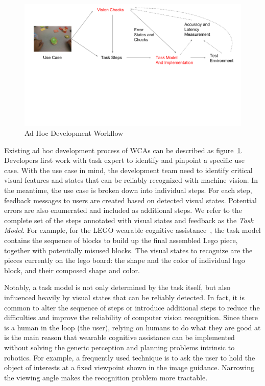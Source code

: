 \begin{figure}
  \centering
  \includegraphics[trim={0 6cm 0 0},width=\linewidth]{FIGS/ad-hoc-workflow}
	\caption{Ad Hoc Development Workflow}
    \label{figs:workflow}
\end{figure}

Existing ad hoc development process of WCAs can be described as
figure~\ref{figs:workflow}. Developers first work with task expert to identify
and pinpoint a specific use case. With the use case in mind, the development
team need to identify critical visual features and states that can be reliably
recognized with machine vision. In the meantime, the use case is broken down
into individual steps. For each step, feedback messages to users are created
based on detected visual states. Potential errors are also enumerated and
included as additional steps. We refer to the complete set of the steps
annotated with visual states and feedback as the \textit{Task Model}. For
example, for the LEGO wearable cognitive assistance~\cite{chen2017empirical},
the task model contains the sequence of blocks to build up the final assembled
Lego piece, together with potentially misused blocks. The visual states to
recognize are the pieces currently on the lego board: the shape and the color of
individual lego block, and their composed shape and color.

Notably, a task model is not only determined by the task itself, but also
influenced heavily by visual states that can be reliably detected. In fact, it
is common to alter the sequence of steps or introduce additional steps to reduce
the difficulties and improve the reliability of computer vision recognition.
Since there is a human in the loop (the user), relying on humans to do what they
are good at is the main reason that wearable cognitive assistance can be
implemented without solving the generic perception and planning problems
intrinsic to robotics. For example, a frequently used technique is to ask the
user to hold the object of interests at a fixed viewpoint shown in the image
guidance. Narrowing the viewing angle makes the recognition problem more
tractable.

